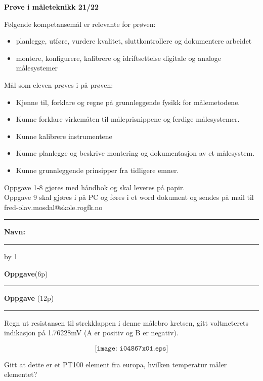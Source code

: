 \documentclass[12pt,a4paper]{article}
\def\oppgave{
            \advance\questnum by 1
	    \ifthenelse{\questnum>0\AND \questnum<9}
	    {
                \vskip 1cm
		\textbf{Oppgave}\hskip 5pt\the\questnum \hfill \hfill(6p)
		\vskip 3pt
		\hrule
	\vskip 0.5cm}
	{
                \vskip 1cm
		\textbf{Oppgave}\hskip 5pt \the\questnum \hfill \hfill(12p)
		\vskip 3pt \hrule \vskip 0.5cm }

		}
\begin{document}
\LARGE
\centerline{\bf Prøve i måleteknikk 21/22}  \bigskip
\normalsize
Følgende kompetansemål er relevante for prøven:
\begin{itemize}[noitemsep]

	\item planlegge, utføre, vurdere kvalitet, sluttkontrollere og dokumentere arbeidet
	\item montere, konfigurere, kalibrere og idriftsettelse digitale og analoge målesystemer
\end{itemize}



Mål som eleven prøves i på prøven: 
\begin{itemize}[noitemsep]
\item Kjenne til, forklare og regne på grunnleggende fysikk for målemetodene.
\item Kunne forklare virkemåten til måleprisnippene og ferdige målesystemer. 
\item Kunne kalibrere instrumentene
\item Kunne planlegge og beskrive montering og dokumentasjon av et målesystem. 
\item Kunne grunnleggende prinsipper fra tidligere emner. 
\end{itemize}



Oppgave 1-8 gjøres med håndbok og skal leveres på papir. \\
Oppgave 9 skal gjøres i på PC og føres i et word  dokument og sendes på mail til fred-olav.mosdal@skole.rogfk.no\\

\bigskip 
\hrule
\bigskip 
\textbf{Navn:}\bigskip 
\hrule
\vfil \eject

\oppgave{} 
\vskip 5pt
Regn ut resistansen til strekklappen i denne målebro kretsen, gitt voltmeterets indikasjon på 1.76228mV (A er positiv og B er negativ).

$$\texttt{[image: i04867x01.eps]}$$

Gitt at dette er et PT100 element fra europa, hvilken temperatur måler elementet?

\vskip 1cm 
\end{document}
